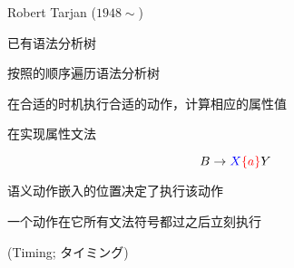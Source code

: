 \begin{frame}{}
    \begin{center}


      Robert Tarjan ($1948 \sim$) \\[6pt]
    \end{center}
\end{frame}

\begin{frame}{}
  \begin{center}
     已有语法分析树

    \vspace{0.50cm}

    \vspace{0.50cm}
    按照的顺序遍历语法分析树

    \vspace{0.50cm}
     在合适的时机执行合适的动作，计算相应的属性值
  \end{center}
\end{frame}

\begin{frame}{}
  \begin{center}
    在实现属性文法
  \end{center}

  \[
    B \to \textcolor{blue}{X} \textcolor{red}{\{a\}} Y
  \]

  \vspace{0.30cm}
  \begin{center}
    语义动作嵌入的位置决定了执行该动作

    \vspace{0.60cm}
     一个动作在它所有文法符号都过之后立刻执行
  \end{center}
\end{frame}

\begin{frame}{}
  \begin{center}
     (Timing; タイミング)


    \vspace{0.30cm}
  \end{center}
\end{frame}

